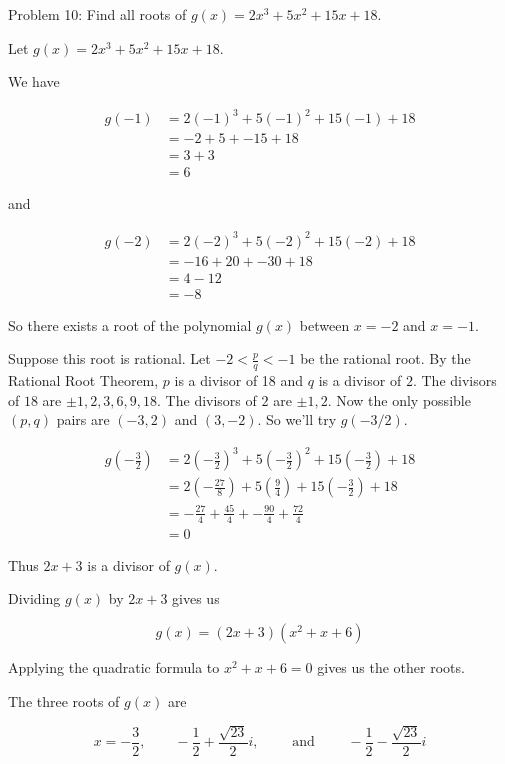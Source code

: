Problem 10: Find all roots of $g(x) = 2x^3 + 5x^2 + 15x + 18$.

Let $g(x) = 2x^3 + 5x^2 + 15x + 18$.

We have

\begin{align*}
g(-1) &= 2(-1)^3 + 5(-1)^2 + 15(-1) + 18 \\
&= -2 + 5 + -15 + 18 \\
&= 3 + 3 \\
&= 6
\end{align*}

and

\begin{align*}
g(-2) &= 2(-2)^3 + 5(-2)^2 + 15(-2) + 18 \\
&= -16 + 20 + -30 + 18 \\
&= 4 - 12 \\
&= -8
\end{align*}

So there exists a root of the polynomial $g(x)$ between $x = -2$ and $x = -1$.

Suppose this root is rational. Let $-2 < \frac{p}{q} < -1$ be the rational root. By the Rational Root Theorem, $p$ is a divisor of 18 and $q$ is a divisor of $2$. The divisors of $18$ are $\pm 1, 2, 3, 6, 9, 18$. The divisors of $2$ are $\pm 1, 2$. Now the only possible $(p, q)$ pairs are $(-3, 2)$ and $(3, -2)$. So we'll try $g(-3/2)$.

\begin{align*}
g\left(-\frac{3}{2}\right) &= 2\left(-\frac{3}{2}\right)^3 + 5\left(-\frac{3}{2}\right)^2 + 15\left(-\frac{3}{2}\right) + 18 \\
&= 2\left(-\frac{27}{8}\right) + 5\left(\frac{9}{4}\right) + 15\left(-\frac{3}{2}\right) + 18 \\
&= -\frac{27}{4} + \frac{45}{4} + -\frac{90}{4} + \frac{72}{4} \\
&= 0
\end{align*}

Thus $2x + 3$ is a divisor of $g(x)$.

Dividing $g(x)$ by $2x + 3$ gives us

\[ g(x) = (2x + 3)(x^2 + x + 6) \]

Applying the quadratic formula to $x^2 + x + 6 = 0$ gives us the other roots.

The three roots of $g(x)$ are

\[ 
\boxed{x = -\frac{3}{2}, \qquad -\frac{1}{2} + \frac{\sqrt{23}}{2}i, \qquad \text{ and } \qquad -\frac{1}{2} - \frac{\sqrt{23}}{2}i} 
\]
